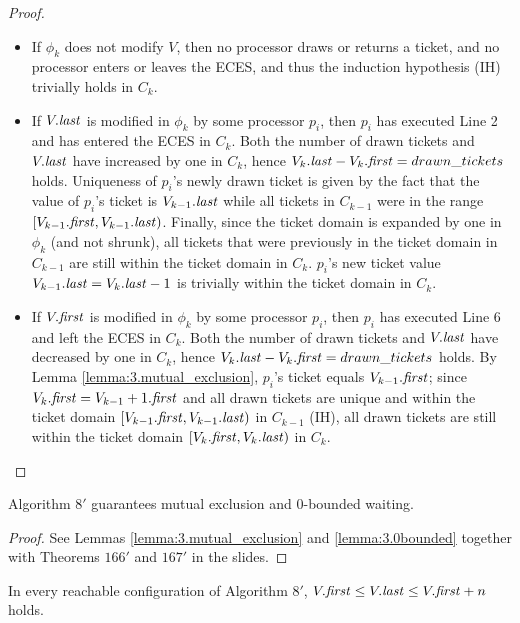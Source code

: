 \begin{proof}
\begin{itemize}
\item If $\phi_k$ does not modify $V$, then no processor draws or returns a ticket,
      and no processor enters or leaves the ECES, and thus the induction hypothesis (IH)
      trivially holds in $C_k$.
\item If $V.\mathit{last}$ is modified in $\phi_k$ by some processor $p_i$, then $p_i$ has executed
      Line 2 and has entered the ECES in $C_k$. Both the number of drawn tickets
      and $V.\mathit{last}$ have increased by one in $C_k$, hence $V_k.\mathit{last} - V_k.\mathit{first} = drawn\_tickets$
      holds. Uniqueness of $p_i$'s newly drawn ticket is given by the fact that
      the value of $p_i$'s ticket is $V_{k-1}.\mathit{last}$ while all tickets in $C_{k-1}$
      were in the range $[V_{k-1}.\mathit{first}, V_{k-1}.\mathit{last})$. Finally, since the ticket domain
      is expanded by one in $\phi_k$ (and not shrunk), all tickets that were previously
      in the ticket domain in $C_{k-1}$ are still within the ticket domain in $C_k$.
      $p_i$'s new ticket value $V_{k-1}.\mathit{last} = V_k.\mathit{last} - 1$ is trivially within
      the ticket domain in $C_k$.
\item If $V.\mathit{first}$ is modified in $\phi_k$ by some processor $p_i$, then $p_i$ has executed
      Line 6 and left the ECES in $C_k$. Both the number of drawn tickets
      and $V.\mathit{last}$ have decreased by one in $C_k$, hence
      $V_k.\mathit{last} - V_k.\mathit{first} = drawn\_tickets$ holds.
      By Lemma \ref{lemma:3.mutual_exclusion}, $p_i$'s ticket equals $V_{k-1}.\mathit{first}$;
      since $V_k.\mathit{first} = V_{k-1} + 1.\mathit{first}$ and all drawn tickets are unique
      and within the ticket domain $[V_{k-1}.\mathit{first}, V_{k-1}.\mathit{last})$ in $C_{k-1}$ (IH),
      all drawn tickets are still within the ticket domain $[V_k.\mathit{first}, V_k.\mathit{last})$
      in $C_k$.
\end{itemize}

\end{proof}

\begin{theorem}
Algorithm $8'$ guarantees mutual exclusion and 0-bounded waiting.
\end{theorem}

\begin{proof}
See Lemmas \ref{lemma:3.mutual_exclusion} and \ref{lemma:3.0bounded} together with
Theorems $166'$ and $167'$ in the slides.
\end{proof}


\begin{lemma} \label{lemma:3.Vbounds}
In every reachable configuration of Algorithm $8'$,
$V.\mathit{first} \leq V.\mathit{last} \leq V.\mathit{first}+n$ holds.
\end{lemma}

